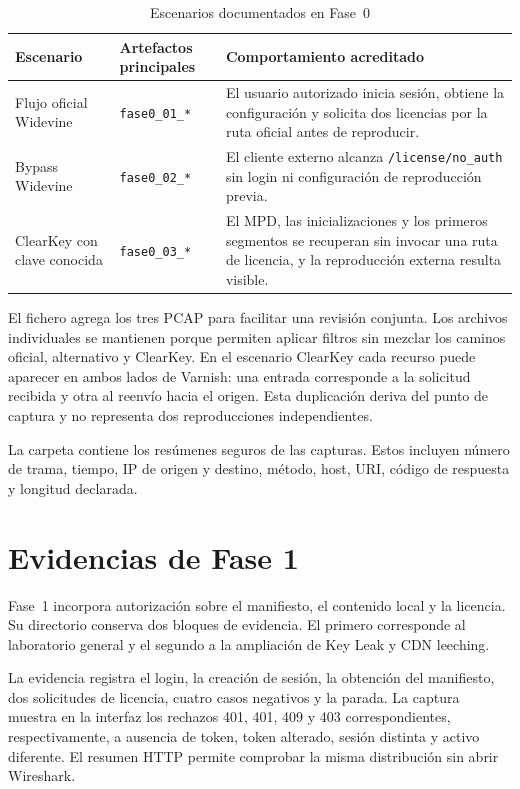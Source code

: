 \begin{table}[H]
\centering
\caption{Escenarios documentados en Fase~0}
\label{tab:evidencias-fase0}
\begin{tabularx}{\textwidth}{p{}p{}Y}
\toprule
\textbf{Escenario} & \textbf{Artefactos principales} & \textbf{Comportamiento acreditado} \\
\midrule
Flujo oficial Widevine & \texttt{fase0\_01\_*} & El usuario autorizado inicia sesión, obtiene la configuración y solicita dos licencias por la ruta oficial antes de reproducir. \\
Bypass Widevine & \texttt{fase0\_02\_*} & El cliente externo alcanza \texttt{/license/no\_auth} sin login ni configuración de reproducción previa. \\
ClearKey con clave conocida & \texttt{fase0\_03\_*} & El MPD, las inicializaciones y los primeros segmentos se recuperan sin invocar una ruta de licencia, y la reproducción externa resulta visible. \\
\bottomrule
\end{tabularx}
\end{table}

El fichero  agrega los tres PCAP para facilitar una revisión conjunta. Los archivos individuales se mantienen porque permiten aplicar filtros sin mezclar los caminos oficial, alternativo y ClearKey. En el escenario ClearKey cada recurso puede aparecer en ambos lados de Varnish: una entrada corresponde a la solicitud recibida y otra al reenvío hacia el origen. Esta duplicación deriva del punto de captura y no representa dos reproducciones independientes.

La carpeta  contiene los resúmenes seguros de las capturas. Estos incluyen número de trama, tiempo, IP de origen y destino, método, host, URI, código de respuesta y longitud declarada.

\section{Evidencias de Fase 1}

Fase~1 incorpora autorización sobre el manifiesto, el contenido local y la licencia. Su directorio conserva dos bloques de evidencia. El primero corresponde al laboratorio general y el segundo a la ampliación de Key Leak y CDN leeching.

La evidencia  registra el login, la creación de sesión, la obtención del manifiesto, dos solicitudes de licencia, cuatro casos negativos y la parada. La captura  muestra en la interfaz los rechazos 401, 401, 409 y 403 correspondientes, respectivamente, a ausencia de token, token alterado, sesión distinta y activo diferente. El resumen HTTP permite comprobar la misma distribución sin abrir Wireshark.

